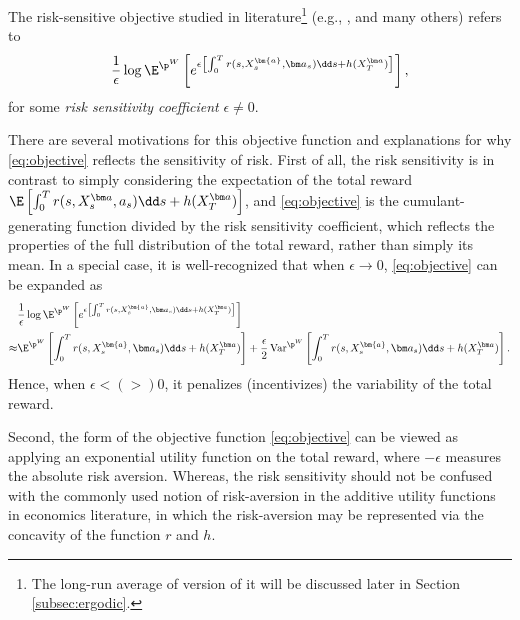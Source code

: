 The risk-sensitive objective studied in literature\footnote{The long-run average of version of it will be discussed later in Section \ref{subsec:ergodic}.} (e.g., \cite{bielecki1999risk,davis2014risk}, and many others) refers to 
\begin{equation}
	\label{eq:objective}
	\frac{1}{\epsilon}\log\E^{\p^W}\left[ e^{\epsilon \left[\int_0^T r(s,X_s^{\bm{a}},\bm a_s)\dd s + h(X_T^{\bm a}) \right]} \right],
\end{equation}
for some \textit{risk sensitivity coefficient} $\epsilon\neq 0$. 

There are several motivations for this objective function and explanations for why \eqref{eq:objective} reflects the sensitivity of risk. First of all, the risk sensitivity is in contrast to simply considering the expectation of the total reward $\E\left[ \int_0^T r(s, X_s^{\bm a}, a_s)\dd s + h(X_T^{\bm a}) \right]$, and \eqref{eq:objective} is the cumulant-generating function divided by the risk sensitivity coefficient, which reflects the properties of the full distribution of the total reward, rather than simply its mean. In a special case, it is well-recognized that when $\epsilon\to 0$, \eqref{eq:objective} can be expanded as 
\begin{equation}
	\label{eq:risk sensitive expansion}
	\begin{aligned}
		& \frac{1}{\epsilon}\log\E^{\p^W}\left[ e^{\epsilon \left[\int_0^T r(s,X_s^{\bm{a}},\bm a_s)\dd s + h(X_T^{\bm a}) \right]} \right] \\
		\approx & \E^{\p^W}\left[ \int_0^T r(s,X_s^{\bm{a}},\bm a_s)\dd s + h(X_T^{\bm a})\right] + \frac{\epsilon}{2}\operatorname{Var}^{\p^W}\left[\int_0^T r(s,X_s^{\bm{a}},\bm a_s)\dd s + h(X_T^{\bm a}) \right]  .
	\end{aligned}
\end{equation}
Hence, when $\epsilon < (>) 0$, it penalizes (incentivizes) the variability of the total reward. 

Second, the form of the objective function \eqref{eq:objective} can be viewed as applying an exponential utility function on the total reward, where $-\epsilon$ measures the absolute risk aversion. Whereas, the risk sensitivity should not be confused with the commonly used notion of risk-aversion in the additive utility functions in economics literature, in which the risk-aversion may be represented via the concavity of the function $r$ and $h$.

